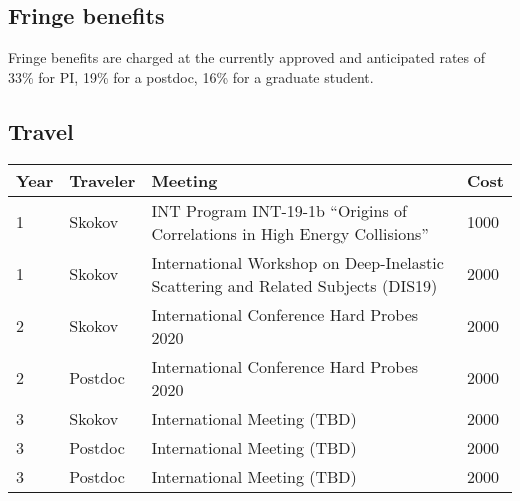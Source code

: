 \documentclass{DOEproposal}
\begin{document}
		\subsection*{Fringe benefits} 
		\vspace{0.5em}			
	
		\noindent 	
		Fringe benefits are charged at the currently approved and anticipated rates of 33\%
		for PI, 19\% for a postdoc, 
		16\% for a graduate student.%
		\vspace{1.2em}			

		\subsection*{Travel} 

		\vspace{0.5em}			
		
		\begin{center}
{%
\begin{tabular}{|l|l|p{90mm}|l| }
\hline
Year &  Traveler \hspace{0.5cm}  &  Meeting  & Cost   \\
\hline
1 &  Skokov  &  INT Program INT-19-1b
``Origins of Correlations in High Energy Collisions'' & 1000   \\
\hline
1  & Skokov  & International Workshop on Deep-Inelastic Scattering and Related Subjects (DIS19)   & 2000   \\ \hline
2  & Skokov  & International Conference Hard Probes 2020  &  2000   \\ \hline
2  & Postdoc  & 
 International Conference Hard Probes 2020 
 &  2000  \\ \hline
3  & Skokov  & International Meeting (TBD) &  2000  \\ \hline
3 & Postdoc &  International Meeting (TBD) &  2000\\ \hline
3 & Postdoc  & International Meeting (TBD) &  2000 \\ \hline
\end{tabular}
}
\end{center}
			
				
\end{document}
